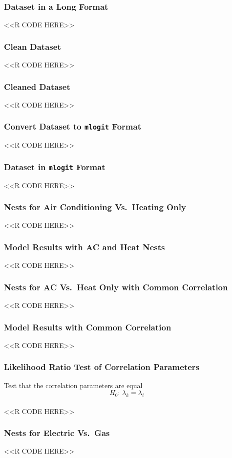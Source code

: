 \documentclass{beamer}
\begin{document}
\begin{frame}[fragile]\frametitle{Dataset in a Long Format}
    <<R CODE HERE>>
\end{frame}

\begin{frame}[fragile]\frametitle{Clean Dataset}
    <<R CODE HERE>>
\end{frame}

\begin{frame}[fragile]\frametitle{Cleaned Dataset}
    <<R CODE HERE>>
\end{frame}

\begin{frame}[fragile]\frametitle{Convert Dataset to \texttt{mlogit} Format}
    <<R CODE HERE>>
\end{frame}

\begin{frame}[fragile]\frametitle{Dataset in \texttt{mlogit} Format}
    <<R CODE HERE>>
\end{frame}

\begin{frame}[fragile]\frametitle{Nests for Air Conditioning Vs.\ Heating Only}
    <<R CODE HERE>>
\end{frame}

\begin{frame}[fragile]\frametitle{Model Results with AC and Heat Nests}
    \vspace{1ex}
    <<R CODE HERE>>
\end{frame}

\begin{frame}[fragile]\frametitle{Nests for AC Vs.\ Heat Only with Common Correlation}
    <<R CODE HERE>>
\end{frame}

\begin{frame}[fragile]\frametitle{Model Results with Common Correlation}
    \vspace{1ex}
    <<R CODE HERE>>
\end{frame}

\begin{frame}[fragile]\frametitle{Likelihood Ratio Test of Correlation Parameters}
    Test that the correlation parameters are equal
    $$H_0 \text{: } \lambda_k = \lambda_{\ell}$$ \\
    \vspace{2ex}
    <<R CODE HERE>>
\end{frame}

\begin{frame}[fragile]\frametitle{Nests for Electric Vs.\ Gas}
    <<R CODE HERE>>
\end{frame}
\end{document}
